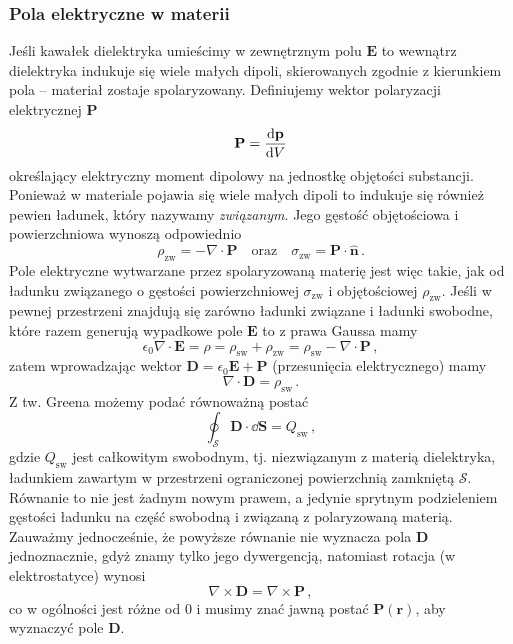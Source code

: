 \documentclass[../main.tex]{subfiles}
\begin{document}
\subsubsection{Pola elektryczne w materii}
Jeśli kawałek dielektryka umieścimy w zewnętrznym polu \(\mathbf{E}\) to wewnątrz dielektryka
indukuje się wiele małych dipoli, skierowanych zgodnie z kierunkiem pola -- materiał zostaje
spolaryzowany. Definiujemy wektor polaryzacji  elektrycznej \(\mathbf{P}\)
\begin{equation*}
    \mathbf{P}=\dv{\mathbf{p}}{V}
\end{equation*}
określający elektryczny moment dipolowy na jednostkę objętości substancji. Ponieważ w materiale
pojawia się wiele małych dipoli to indukuje się również pewien ładunek, który nazywamy
\textit{związanym}. Jego gęstość objętościowa i powierzchniowa wynoszą odpowiednio
\begin{equation*}
    \rho_\text{zw}=-\nabla\cdot\mathbf{P}\quad\text{oraz}\quad \sigma_\text{zw}=\mathbf{P}\cdot\mathbf{\hat{n}}\,.
\end{equation*}
Pole elektryczne wytwarzane przez spolaryzowaną materię jest więc takie, jak od ładunku związanego o
gęstości powierzchniowej \(\sigma_\text{zw}\) i objętościowej \(\rho_\text{zw}\). Jeśli w pewnej
przestrzeni znajdują się zarówno ładunki związane i ładunki swobodne, które razem generują wypadkowe
pole \(\mathbf{E}\) to z prawa Gaussa mamy
\begin{equation*}
    \epsilon_0\nabla\cdot\mathbf{E}=\rho=\rho_\text{sw}+\rho_\text{zw}=\rho_\text{sw}-\nabla\cdot\mathbf{P}\,,
\end{equation*}
zatem wprowadzając wektor \(\mathbf{D}=\epsilon_0\mathbf{E}+\mathbf{P}\) (przesunięcia
elektrycznego) mamy
\begin{equation*}
    \nabla\cdot\mathbf{D}=\rho_\text{sw}\,.
\end{equation*}
Z tw. Greena możemy podać równoważną postać
\begin{equation*}
    \oint_\mathcal{S}\mathbf{D}\cdot\dd{\mathbf{S}}=Q_\text{sw}\,,
\end{equation*}
gdzie \(Q_\text{sw}\) jest całkowitym swobodnym, tj. niezwiązanym z materią dielektryka, ładunkiem
zawartym w przestrzeni ograniczonej powierzchnią zamkniętą \(\mathcal{S}\). Równanie to nie jest
żadnym nowym prawem, a jedynie sprytnym podzieleniem gęstości ładunku na część swobodną i związaną z
polaryzowaną materią. Zauważmy jednocześnie, że powyższe równanie nie wyznacza pola \(\mathbf{D}\)
jednoznacznie, gdyż znamy tylko jego dywergencją, natomiast rotacja (w elektrostatyce) wynosi
\begin{equation*}
    \nabla\times\mathbf{D}=\nabla\times\mathbf{P}\,,
\end{equation*}
co w ogólności jest różne od 0 i musimy znać jawną postać \(\mathbf{P}(\mathbf{r})\), aby wyznaczyć
pole \(\mathbf{D}\).
\end{document}
